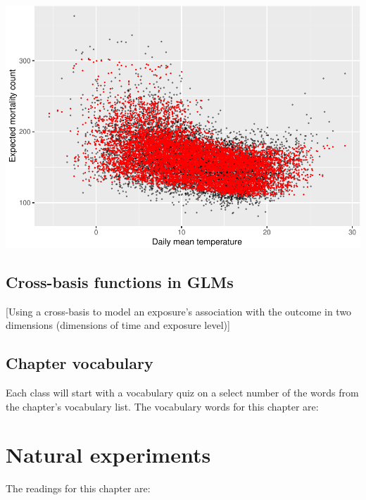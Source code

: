 \documentclass[
]{book}
\begin{document}
\includegraphics{adv_epi_analysis_files/figure-latex/unnamed-chunk-60-1.pdf}

\hypertarget{cross-basis-functions-in-glms}{%
\section{Cross-basis functions in GLMs}\label{cross-basis-functions-in-glms}}

{[}Using a cross-basis to model an exposure's association with the
outcome in two dimensions (dimensions of time and exposure level){]}

\hypertarget{chapter-vocabulary}{%
\section{Chapter vocabulary}\label{chapter-vocabulary}}

Each class will start with a vocabulary quiz on a select number of the words
from the chapter's vocabulary list. The vocabulary words for this chapter are:

\hypertarget{natural-experiments}{%
\chapter{Natural experiments}\label{natural-experiments}}

The readings for this chapter are:
\end{document}
